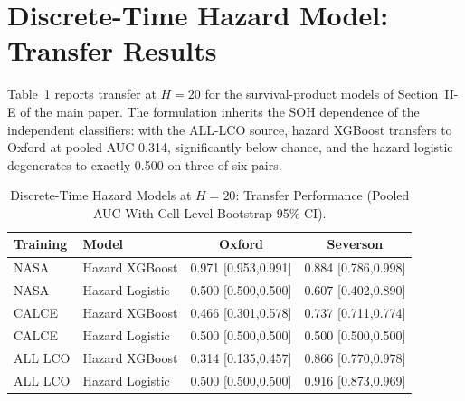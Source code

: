 \documentclass[journal]{IEEEtran}
\begin{document}
\section{Discrete-Time Hazard Model: Transfer Results}
Table~\ref{tab:s_hazard} reports transfer at $H{=}20$ for the survival-product models of Section~II-E of the main paper. The formulation inherits the SOH dependence of the independent classifiers: with the ALL-LCO source, hazard XGBoost transfers to Oxford at pooled AUC 0.314, significantly below chance, and the hazard logistic degenerates to exactly 0.500 on three of six pairs.
\begin{table}[!t]
\caption{Discrete-Time Hazard Models at $H{=}20$: Transfer Performance (Pooled AUC With Cell-Level Bootstrap 95\% CI).}
\label{tab:s_hazard}
\centering\footnotesize\setlength{\tabcolsep}{3pt}
\begin{tabular}{llcc}
\toprule
\textbf{Training} & \textbf{Model} & \textbf{Oxford} & \textbf{Severson}\\
\midrule
NASA & Hazard XGBoost & 0.971 [0.953,0.991] & 0.884 [0.786,0.998]\\
NASA & Hazard Logistic & 0.500 [0.500,0.500] & 0.607 [0.402,0.890]\\
CALCE & Hazard XGBoost & 0.466 [0.301,0.578] & 0.737 [0.711,0.774]\\
CALCE & Hazard Logistic & 0.500 [0.500,0.500] & 0.500 [0.500,0.500]\\
ALL LCO & Hazard XGBoost & 0.314 [0.135,0.457] & 0.866 [0.770,0.978]\\
ALL LCO & Hazard Logistic & 0.500 [0.500,0.500] & 0.916 [0.873,0.969]\\
\bottomrule
\end{tabular}
\end{table}
\end{document}
